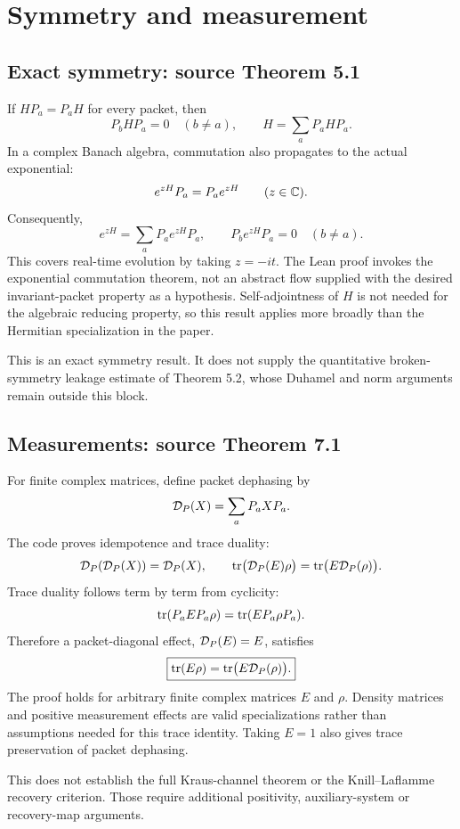 \section{Symmetry and measurement}\label{supp1:section:002}
\subsection{Exact symmetry: source Theorem 5.1}
If $HP_a=P_aH$ for every packet, then
\[
P_bHP_a=0\quad(b\ne a),\qquad H=\sum_aP_aHP_a.
\]
In a complex Banach algebra, commutation also propagates to the actual exponential:
\[
e^{zH}P_a=P_ae^{zH}\qquad(z\in\C).
\]
Consequently,
\[
e^{zH}=\sum_aP_ae^{zH}P_a,
\qquad P_be^{zH}P_a=0\quad(b\ne a).
\]
This covers real-time evolution by taking $z=-it$. The Lean proof invokes the exponential commutation theorem, not an abstract flow supplied with the desired invariant-packet property as a hypothesis. Self-adjointness of $H$ is not needed for the algebraic reducing property, so this result applies more broadly than the Hermitian specialization in the paper.



This is an exact symmetry result. It does not supply the quantitative broken-symmetry leakage estimate of Theorem 5.2, whose Duhamel and norm arguments remain outside this block.

\subsection{Measurements: source Theorem 7.1}
For finite complex matrices, define packet dephasing by
\[
\deph(X)=\sum_aP_aXP_a.
\]
The code proves idempotence and trace duality:
\[
\deph(\deph(X))=\deph(X),\qquad
\tr\bigl(\deph(E)\rho\bigr)=\tr\bigl(E\deph(\rho)\bigr).
\]
Trace duality follows term by term from cyclicity:
\[
\operatorname{tr}(P_aEP_a\rho)=\operatorname{tr}(EP_a\rho P_a).
\]
Therefore a packet-diagonal effect, $\deph(E)=E$, satisfies
\[
\boxed{\tr(E\rho)=\tr\bigl(E\deph(\rho)\bigr).}
\]
The proof holds for arbitrary finite complex matrices $E$ and $\rho$. Density matrices and positive measurement effects are valid specializations rather than assumptions needed for this trace identity. Taking $E=1$ also gives trace preservation of packet dephasing.



This does not establish the full Kraus-channel theorem or the Knill--Laflamme recovery criterion. Those require additional positivity, auxiliary-system or recovery-map arguments.



